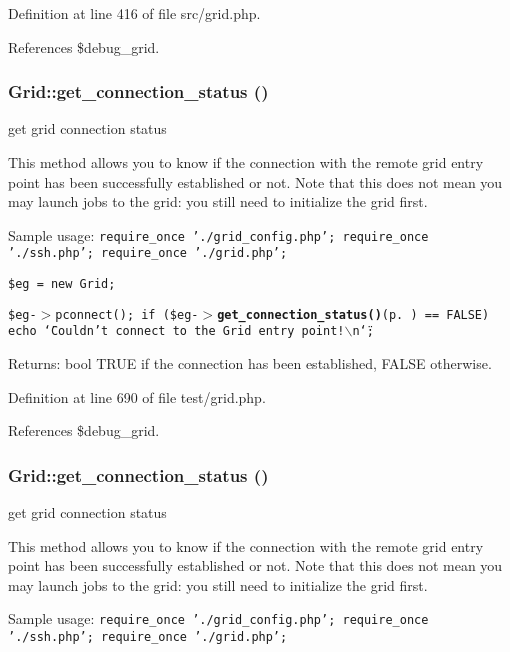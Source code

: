 Definition at line 416 of file src/grid.php.

References \$debug\_\-grid.
\subsubsection{\setlength{\rightskip}{0pt plus 5cm}Grid::get\_\-connection\_\-status ()}\label{classGrid_a34}


get grid connection status 

This method allows you to know if the connection with the remote grid entry point has been successfully established or not. Note that this does not mean you may launch jobs to the grid: you still need to initialize the grid first.

Sample usage: {\tt  require\_\-once './grid\_\-config.php'; require\_\-once './ssh.php'; require\_\-once './grid.php';}

{\tt  \$eg = new Grid;}

{\tt  \$eg-$>$pconnect(); if (\$eg-$>${\bf get\_\-connection\_\-status()}{\rm (p.\,\pageref{classGrid_a8})} == FALSE) echo \char`\"{}Couldn't connect to the Grid entry point!$\backslash$n\char`\"{}; }

\begin{Desc}
\item[Returns:]bool TRUE if the connection has been established, FALSE otherwise. \end{Desc}


Definition at line 690 of file test/grid.php.

References \$debug\_\-grid.
\subsubsection{\setlength{\rightskip}{0pt plus 5cm}Grid::get\_\-connection\_\-status ()}\label{classGrid_a8}


get grid connection status 

This method allows you to know if the connection with the remote grid entry point has been successfully established or not. Note that this does not mean you may launch jobs to the grid: you still need to initialize the grid first.

Sample usage: {\tt  require\_\-once './grid\_\-config.php'; require\_\-once './ssh.php'; require\_\-once './grid.php';}

